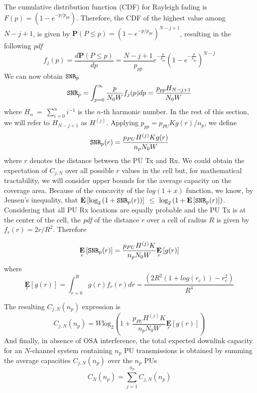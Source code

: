 The cumulative distribution function (CDF) for Rayleigh fading is $F(p)=(1-e^{-p/p_{pp}})$.
Therefore, the CDF of the highest value among $N-j+1$, is given by $\mathbf{P}(P\leq p) = (1-e^{-p/p_{pp}})^{N-j+1}$, resulting in the following \textit{pdf}
\begin{equation}
f_{j}(p) = \displaystyle\frac{d\mathbf{P}(P\leq p)}{dp} = \frac{N-j+1}{p_{pp}}e^{-\frac{p}{p_{pp}}}\left(1-e^{-\frac{p}{p_{pp}}}\right)^{N-j}
\end{equation}
We can now obtain $\text{\ttfamily{SNR}}_{p}$
\begin{equation}
\text{\ttfamily{SNR}}_{p} = \displaystyle\int_{p=0}^{\infty}\displaystyle\frac{p}{N_{0}W}f_{j}(p)dp = \displaystyle\frac{p_{pp}H_{N-j+1}}{N_{0}W}
\end{equation}
where $H_{n}~=~\sum_{i=0}^{n}i^{-1}$ is the $n$-th harmonic number. In the rest of this section, we will refer to $H_{N-j+1}$ as $H^{(j)}$. Applying $p_{pp}=p_{PU}Kg(r)/n_{p}$, we define
\begin{equation}
\text{\ttfamily{SNR}}_{p}(r) = \displaystyle\frac{p_{PU}H^{(j)}Kg(r)}{n_{p}N_{0}W}
\end{equation}
where $r$ denotes the distance between the PU Tx and Rx.
We could obtain the expectation of $C_{j,N}$ over all possible $r$ values in the cell but, for mathematical tractability, we will consider upper bounds for the average capacity on the coverage area. Because of the concavity of the $log(1+x)$ function, we know, by Jensen's inequality, that $\mathbf{E}\left[\text{log}_{2}\left(1+\text{\ttfamily{SNR}}_{p}(r)\right)\right]$ $\leq$ $\text{log}_{2}\left(1+\mathbf{E}\left[\text{\ttfamily{SNR}}_{p}(r)\right]\right)$.
Considering that all PU Rx locations are equally probable and the PU Tx is at the center of the cell, the \textit{pdf} of the distance $r$ over a cell of radius $R$ is given by $f_{r}(r)=2r/R^{2}$. Therefore

\begin{equation}\label{SNRp}
\underset{r}{\mathbf{E}}\left[\text{\ttfamily{SNR}}_{p}(r)\right] = \displaystyle\frac{p_{PU} H^{(j)}K}{n_{p}N_{0}W}\underset{r}{\mathbf{E}}\left[g(r)\right]
\end{equation}
where
\begin{equation}\label{Egr}
\underset{r}{\mathbf{E}}\left[g(r)\right] = \int_{r=0}^{R}g(r)f_{r}(r)dr = \frac{\left(2R^{2}\left(1+log(r_{c})\right)-r_{c}^{2}\right)}{R^{4}}
\end{equation}

The resulting $C_{j,N}(n_{p})$ expression is
\begin{equation}\label{CjN}
C_{j,N}(n_{p}) = 
W\text{log}_{2}\left(1+\frac{p_{PU}H^{(j)}K}{n_{p}N_{0}W}\underset{r}{\mathbf{E}}\left[g(r)\right]\right)
\end{equation}
And finally, in absence of OSA interference, the total expected downlink capacity for an $N$-channel system containing $n_{p}$ PU transmissions is obtained by summing the average capacities $C_{j,N}\left(n_{p}\right)$ over the $n_{p}$ PUs
\begin{equation}\label{totalCapacity}
C_{N}\left(n_{p}\right) = \displaystyle\sum_{j=1}^{n_{p}}C_{j,N}\left(n_{p}\right)
\end{equation}

